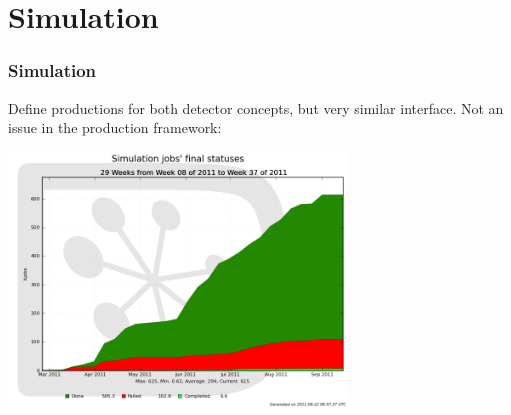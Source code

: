 \documentclass{beamer}
\begin{document}
\section{Simulation}
\begin{frame}
\frametitle{Simulation}
Define productions for both detector concepts, but very similar interface. Not an issue in the production framework:\\
\begin{center}
\includegraphics[width=9cm]{SimJobStatus}
\end{center}
\end{frame}
\end{document}
